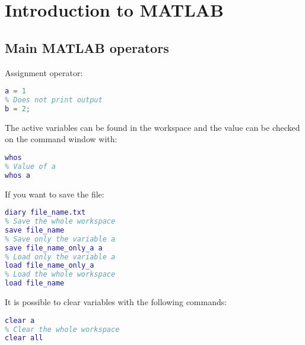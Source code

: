\documentclass[12pt, a4paper]{report}
\newtheorem[style=M,bodystyle=\normalfont]{theorem}{Theorem}
\newtheorem[style=M,bodystyle=\normalfont]{corollary}{Corollary}
\newtheorem[style=M,bodystyle=\normalfont]{lemma}{Lemma}
\newtheorem[style=M,bodystyle=\normalfont]{definition}{Definition}
\begin{document}
\newpage

\tableofcontents

\newpage

\chapter{Introduction to MATLAB}
    \section{Main MATLAB operators}
    Assignment operator: 
    \begin{lstlisting}[language=Matlab]
% Print output
a = 1 
% Does not print output
b = 2;
    \end{lstlisting}
    The active variables can be found in the workspace and the value can be checked on the command window with: 
    \begin{lstlisting}[language=Matlab]
% Value of all variables
whos
% Value of a
whos a
    \end{lstlisting}
    If you want to save the file: 
    \begin{lstlisting}[language=Matlab]
% Save the command history
diary file_name.txt 
% Save the whole workspace
save file_name 
% Save only the variable a
save file_name_only_a a 
% Load only the variable a
load file_name_only_a 
% Load the whole workspace
load file_name 
    \end{lstlisting}
    It is possible to clear variables with the following commands: 
    \begin{lstlisting}[language=Matlab]
% Clear only the variable a
clear a 
% Clear the whole workspace
clear all 
    \end{lstlisting}
\end{document}
